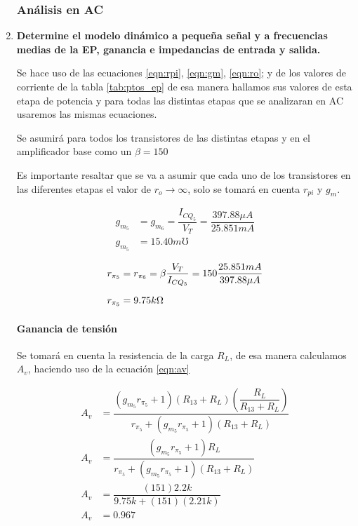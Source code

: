 \begin{enumerate}
        \subsubsection{Análisis en AC}
  \item \textbf{Determine el modelo dinámico a pequeña señal y a frecuencias medias de la EP, ganancia e impedancias de entrada y salida.}

        Se hace uso de las ecuaciones \ref{eqn:rpi}, \ref{eqn:gm}, \ref{eqn:ro}; y de los valores de corriente de la tabla \ref{tab:ptos_ep} de esa manera hallamos sus valores de esta etapa de potencia y para todas las distintas etapas que se analizaran en AC usaremos las mismas ecuaciones.

        Se asumirá para todos los transistores de las distintas etapas y en el amplificador base como un $\beta=150$

        Es importante resaltar que se va a asumir que cada uno de los transistores en las diferentes etapas el valor de $r_o \to \infty$, solo se tomará en cuenta $r_{pi}$ y $g_m$.

        \begin{align*}
          g_{m_5} & =g_{m_6}=\dfrac{I_{CQ_5}}{V_T}=\dfrac{397.88 \mu A}{25.851 mA} \nonumber \\[0.2cm]
          g_{m_5} & =15.40m \mho
        \end{align*}

        \begin{align*}
          r_{\pi_5} & =r_{\pi_6}=\beta \dfrac{V_T}{I_{CQ_5}}=150 \dfrac{25.851 mA}{397.88 \mu A} \nonumber \\[0.2cm]
          r_{\pi_5} & =9.75 k \ohm
        \end{align*}

        \paragraph{\textbf{Ganancia de tensión}}


        Se tomará en cuenta la resistencia de la carga $R_L$, de esa manera calculamos $A_v$, haciendo uso de la ecuación \ref{eqn:av}

        \begin{align*}
          A_v & = \dfrac{(g_{m_5}r_{\pi_5}+1)(R_{13}+R_L) \left(\dfrac{R_L}{R_{13}+R_L}\right)}{r_{\pi_5}+(g_{m_5}r_{\pi_5}+1)(R_{13}+R_L) } \nonumber \\[0.2cm]
          A_v & = \dfrac{(g_{m_5}r_{\pi_5}+1)R_L}{r_{\pi_5}+(g_{m_5}r_{\pi_5}+1)(R_{13}+R_L) }\nonumber                                                \\[0.2cm]
          A_v & = \dfrac{(151)2.2k}{9.75k+(151)(2.21k) }\nonumber                                                                                      \\[0.2cm]
          A_v & = 0.967                                                                                                                                \\[0.2cm]
        \end{align*}


\end{enumerate}
